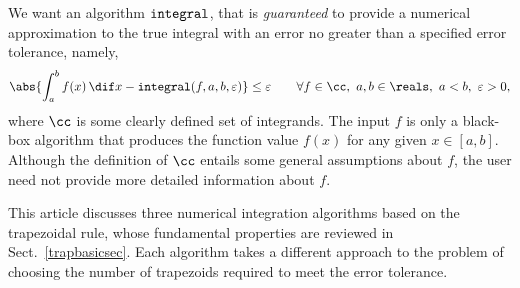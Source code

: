 \documentclass[]{article}
\DeclareMathOperator{\integ}{\texttt{\textup{integral}}}
\theoremstyle{definition}
\theoremstyle{remark}
\begin{document}
We want an algorithm $\integ$, that is \emph{guaranteed} to provide a numerical approximation to the true integral with an error no greater than a specified error tolerance, namely,
\begin{equation*}
\abs{\int_a^b f(x) \, \dif x - \integ(f,a,b,\varepsilon)} \le \varepsilon \qquad \forall f \in \cc,\ a, b \in \reals, \ a < b, \ \varepsilon > 0,
\end{equation*}
where $\cc$ is some clearly defined set of integrands.  The input $f$ is only a black-box algorithm that produces the function value $f(x)$ for any given $x \in [a,b]$.  Although the definition of $\cc$ entails some general assumptions about $f$, the user need not provide more detailed information about $f$.

This article discusses three numerical integration algorithms based on the trapezoidal rule, whose fundamental properties are reviewed in Sect.\ \ref{trapbasicsec}.  Each algorithm takes a different approach to the problem of choosing the number of trapezoids required to meet the error tolerance.
\end{document}
